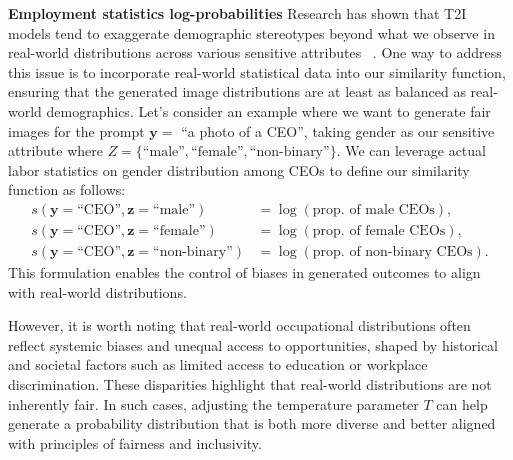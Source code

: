\noindent \textbf{Employment statistics log-probabilities} 
Research has shown that T2I models tend to exaggerate demographic stereotypes beyond what we observe in real-world distributions across various sensitive attributes ~\cite{naik2023social}. One way to address this issue is to incorporate real-world statistical data into our similarity function, ensuring that the generated image distributions are at least as balanced as real-world demographics. Let's consider an example where we want to generate fair images for the prompt $\mathbf{y} = $ ``a photo of a CEO'', taking gender as our sensitive attribute where $Z = \{\text{``male''}, \text{``female''}, \text{``non-binary''}\}$. We can leverage actual labor statistics on gender distribution among CEOs to define our similarity function as follows:
{\small
\begin{align*}
s(\mathbf{y}=\text{``CEO''}, \mathbf{z}=\text{``male''})      &= \log (\text{prop. of male CEOs}), \\
s(\mathbf{y}=\text{``CEO''}, \mathbf{z}=\text{``female''})    &= \log (\text{prop. of female CEOs}), \\
s(\mathbf{y}=\text{``CEO''}, \mathbf{z}=\text{``non-binary''}) &= \log (\text{prop. of non-binary CEOs}).
\end{align*}
}
This formulation enables the control of biases in generated outcomes to align with real-world distributions.

However, it is worth noting that real-world occupational distributions often reflect systemic biases and unequal access to opportunities, shaped by historical and societal factors such as limited access to education or workplace discrimination. These disparities highlight that real-world distributions are not inherently fair. In such cases, adjusting the temperature parameter $T$ can help generate a probability distribution that is both more diverse and better aligned with principles of fairness and inclusivity.